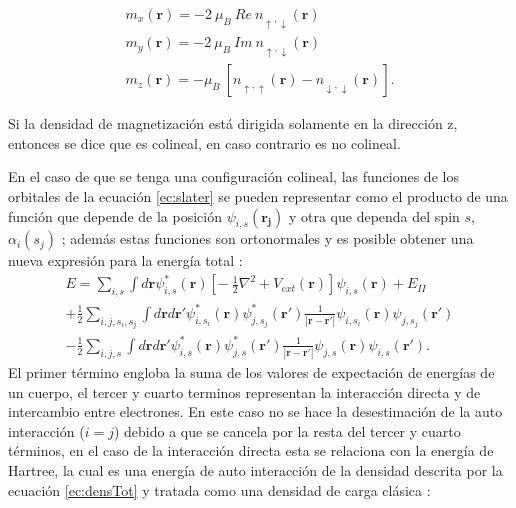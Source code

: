 	\begin{subequations} \label{ec:compm}
		\begin{gather}
		m_x (\pmb{r})= -2 ~\mu_{B} ~Re~ n_{\uparrow, \downarrow} (\pmb{r}) \label{ec:compm1}\\
		m_y (\pmb{r})= -2 ~\mu_{B} ~Im~ n_{\uparrow, \downarrow} (\pmb{r}) \label{ec:compm2}\\
		m_z (\pmb{r}) = - \mu_{B} ~[n_{\uparrow, \uparrow} (\pmb{r})- n_{\downarrow, \downarrow} (\pmb{r})] . \label{ec:compm3}
		\end{gather}
	\end{subequations}
  
  Si la densidad de magnetizaci\'on est\'a dirigida solamente en la direcci\'on z, entonces se dice que es colineal, en caso contrario es no colineal. 
  \newline 
  \par En el caso de que se tenga una configuraci\'on colineal, las funciones de los orbitales de la ecuaci\'on \ref{ec:slater} se pueden representar como el producto de una funci\'on que depende de la posici\'on $ \psi_{i,s} (\pmb{r_j}) $ y otra que dependa del spin $s$, $ \alpha_i (s_j)$ \cite{Martin-2004}; adem\'as estas funciones son ortonormales y es posible obtener una nueva expresi\'on para la energ\'ia total :
  \begin{multline}
  E =\sum_{i,s} \int d\pmb{r} \psi_{i,s}^* (\pmb{r})\left [ -~\frac{1}{2} \nabla^2 + V_{ext} (\pmb{r}) \right] \psi_{i,s} (\pmb{r}) +E_{II}\\
  +\frac{1}{2} \sum_{i,j,s_i,s_j} \int d\pmb{r} d\pmb{r'} \psi_{i,s_i}^* (\pmb{r}) \psi_{j,s_j}^* (\pmb{r '}) \frac{1}{|\pmb{r}-\pmb{r'}|} \psi_{i,s_i} (\pmb{r}) \psi_{j,s_j} (\pmb{r '})\\
  -\frac{1}{2} \sum_{i,j,s} \int d\pmb{r} d\pmb{r'} \psi_{i,s}^* (\pmb{r}) \psi_{j,s}^* (\pmb{r '}) \frac{1}{|\pmb{r}-\pmb{r'}|} \psi_{j,s} (\pmb{r}) \psi_{i,s} (\pmb{r '}). \label{ec:ecEnergia}
  \end{multline} 
  El primer t\'ermino engloba la suma de los valores de expectaci\'on  de energ\'ias de un cuerpo, el tercer y cuarto terminos representan la interacci\'on directa y de intercambio entre electrones. En este caso no se hace la desestimaci\'on de la auto interacci\'on ($ i=j$) debido a que se cancela por la resta del tercer y cuarto t\'erminos, en el caso de la interacci\'on directa esta se relaciona con la energ\'ia de Hartree, la cual es una energ\'ia de auto interacci\'on  de la densidad descrita por la ecuaci\'on \ref{ec:densTot} y tratada como una densidad de carga cl\'asica \cite{Faustino-2014}:
